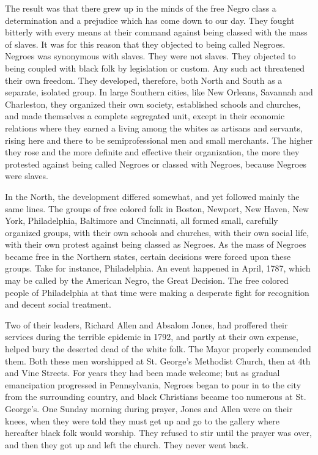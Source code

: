 \documentclass[letterpaper,10pt,english]{jupyterBook}
\begin{document}
\sphinxAtStartPar
The result was that there grew up in the minds of the free Negro class a determination and a prejudice which has come down to our day. They fought bitterly with every means at their command against being classed with the mass of slaves. It was for this reason that they objected to being called Negroes. Negroes was synonymous with slaves. They were not slaves. They objected to being coupled with black folk by legislation or custom. Any such act threatened their own freedom. They developed, therefore, both North and South as a separate, isolated group. In large Southern cities, like New Orleans, Savannah and Charleston, they organized their own society, established schools and churches, and made themselves a complete segregated unit, except in their economic relations where they earned a living among the whites as artisans and servants, rising here and there to be semi\sphinxhyphen{}professional men and small merchants. The higher they rose and the more definite and effective their organization, the more they protested against being called Negroes or classed with Negroes, because Negroes were slaves.

\sphinxAtStartPar
In the North, the development differed somewhat, and yet followed mainly the same lines. The groups of free colored folk in Boston, Newport, New Haven, New York, Philadelphia, Baltimore and Cincinnati, all formed small, carefully organized groups, with their own schools and churches, with their own social life, with their own protest against being classed as Negroes. As the mass of Negroes became free in the Northern states, certain decisions were forced upon these groups. Take for instance, Philadelphia. An event happened in April, 1787, which may be called by the American Negro, the Great Decision. The free colored people of Philadelphia at that time were making a desperate fight for recognition and decent social treatment.

\begin{sphinxShadowBox}
\sphinxstylesidebartitle{}

\sphinxAtStartPar
{}
\end{sphinxShadowBox}

\sphinxAtStartPar
Two of their leaders, Richard Allen and Absalom Jones, had proffered their services during the terrible epidemic in 1792, and partly at their own expense, helped bury the deserted dead of the white folk. The Mayor properly commended them. Both these men worshipped at St. George’s Methodist Church, then at 4th and Vine Streets. For years they had been made welcome; but as gradual emancipation progressed in Pennsylvania, Negroes began to pour in to the city from the surrounding country, and black Christians became too numerous at St. George’s. One Sunday morning during prayer, Jones and Allen were on their knees, when they were told they must get up and go to the gallery where hereafter black folk would worship. They refused to stir until the prayer was over, and then they got up and left the church. They never went back.
\end{document}
